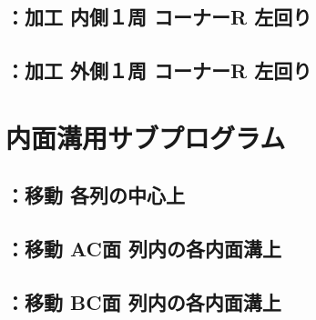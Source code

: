 \subsection{\KICRLeft：加工 内側１周 コーナーR 左回り}



\clearpage
\subsection{\KOCRLeft：加工 外側１周 コーナーR 左回り}


\texttt{}

\clearpage
\section{内面溝用サブプログラム}


\subsection{\DLone：移動 各列の中心上}



\clearpage
\subsection{\DLtwoAC：移動 AC面 列内の各内面溝上}



\clearpage
\subsection{\DLtwoBD：移動 BC面 列内の各内面溝上}



